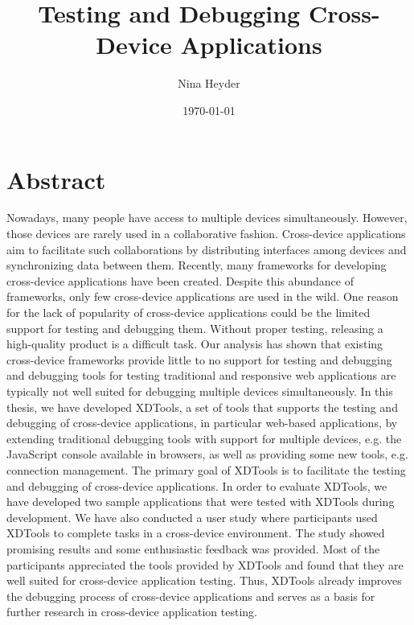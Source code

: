 \documentclass[11pt,a4paper]{globis-book}
\title{Testing and Debugging Cross-Device Applications}
\author{Nina Heyder}
\institute{Institute of Information Systems}
\date{\today}
\begin{document}
\frontmatter
\maketitlepage
\cleardoublepage
{}

\chapter*{Abstract}

Nowadays, many people have access to multiple devices simultaneously. However, those devices are rarely used in a collaborative fashion. Cross-device applications aim to facilitate such collaborations by distributing interfaces among devices and synchronizing data between them. Recently, many frameworks for developing cross-device applications have been created. Despite this abundance of frameworks, only few cross-device applications are used in the wild. One reason for the lack of popularity of cross-device applications could be the limited support for testing and debugging them. Without proper testing, releasing a high-quality product is a difficult task. Our analysis has shown that existing cross-device frameworks provide little to no support for testing and debugging and debugging tools for testing traditional and responsive web applications are typically not well suited for debugging multiple devices simultaneously. In this thesis, we have developed XDTools, a set of tools that supports the testing and debugging of cross-device applications, in particular web-based applications, by extending traditional debugging tools with support for multiple devices, e.g. the JavaScript console available in browsers, as well as providing some new tools, e.g. connection management. The primary goal of XDTools is to facilitate the testing and debugging of cross-device applications. In order to evaluate XDTools, we have developed two sample applications that were tested with XDTools during development. We have also conducted a user study where participants used XDTools to complete tasks in a cross-device environment. The study showed promising results and some enthusiastic feedback was provided. Most of the participants appreciated the tools provided by XDTools and found that they are well suited for cross-device application testing. Thus, XDTools already improves the debugging process of cross-device applications and serves as a basis for further research in cross-device application testing.

\tableofcontents

\mainmatter









\end{document}
